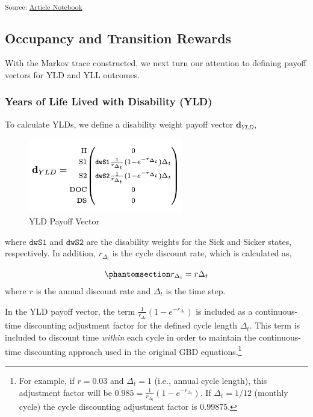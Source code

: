 \documentclass[
]{agujournal2019}
\begin{document}
\textsubscript{Source:
\href{https://graveja0.github.io/dalys/index.qmd.html}{Article
Notebook}}

\subsection{Occupancy and Transition
Rewards}\label{occupancy-and-transition-rewards}

With the Markov trace constructed, we next turn our attention to
defining payoff vectors for YLD and YLL outcomes.

\subsubsection{Years of Life Lived with Disability
(YLD)}\label{years-of-life-lived-with-disability-yld}

To calculate YLDs, we define a disability weight payoff vector
\(\mathbf{d}_{YLD}\),

\begin{figure}[H]

{\centering \includegraphics[width=0.6\textwidth,height=\textheight]{images/d_yld.png}

}

\caption{YLD Payoff Vector}

\end{figure}%

where \(\texttt{dwS1}\) and \(\texttt{dwS2}\) are the disability weights
for the Sick and Sicker states, respectively. In addition,
\(r_{\Delta_t}\) is the cycle discount rate, which is calculated as,

\begin{equation}\phantomsection\label{eq-cycledisc}{
r_{\Delta_t} = r \Delta_t
}\end{equation} where \(r\) is the annual discount rate and \(\Delta_t\)
is the time step.

In the YLD payoff vector, the term
\(\frac{1}{r_{\Delta_t}}(1-e^{-r_{\Delta_t}})\) is included as a
continuous-time discounting adjustment factor for the defined cycle
length \(\Delta_t\). This term is included to discount time
\emph{within} each cycle in order to maintain the continuous-time
discounting approach used in the original GBD equations.\footnote{For
  example, if \(r=0.03\) and \(\Delta_t=1\) (i.e., annual cycle length),
  this adjustment factor will be
  \(0.985 = \frac{1}{r_{\Delta_t}}(1-e^{-r_{\Delta_t}})\). If
  \(\Delta_t=1/12\) (monthly cycle) the cycle discounting adjustment
  factor is 0.99875.}
\end{document}
